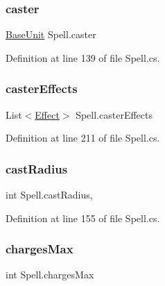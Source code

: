 \subsubsection{\texorpdfstring{caster}{caster}}
{\footnotesize\ttfamily \mbox{\hyperlink{class_base_unit}{Base\+Unit}} Spell.\+caster\hspace{0.3cm}{\ttfamily [get]}}



Definition at line 139 of file Spell.\+cs.

\mbox{\label{class_spell_a4e1ab6af2261882a87a0cb60a944306f}} 
\subsubsection{\texorpdfstring{casterEffects}{casterEffects}}
{\footnotesize\ttfamily List$<$\mbox{\hyperlink{class_effect}{Effect}}$>$ Spell.\+caster\+Effects\hspace{0.3cm}{\ttfamily [get]}}



Definition at line 211 of file Spell.\+cs.

\mbox{\label{class_spell_aa868e1b844177f20440e0b15f7d42692}} 
\subsubsection{\texorpdfstring{castRadius}{castRadius}}
{\footnotesize\ttfamily int Spell.\+cast\+Radius\hspace{0.3cm}{\ttfamily [get]}, {\ttfamily [set]}}



Definition at line 155 of file Spell.\+cs.

\mbox{\label{class_spell_a13096b0c79d853c52e9d69ff6c913563}} 
\subsubsection{\texorpdfstring{chargesMax}{chargesMax}}
{\footnotesize\ttfamily int Spell.\+charges\+Max\hspace{0.3cm}{\ttfamily [get]}}




